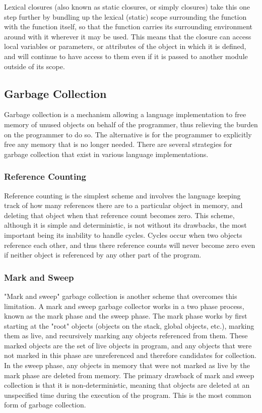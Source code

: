 \documentclass[12pt,a4paper,final,twoside,titlepage]{book}
\begin{document}
Lexical closures (also known as static closures, or simply closures) take this one step further by bundling up the lexical (static) scope surrounding the function with the function itself, so that the function carries its surrounding environment around with it wherever it may be used. This means that the closure can access local variables or parameters, or attributes of the object in which it is defined, and will continue to have access to them even if it is passed to another module outside of its scope.

\subsection{Garbage Collection}
Garbage collection is a mechanism allowing a language implementation to free memory of unused objects on behalf of the programmer, thus relieving the burden on the programmer to do so. The alternative is for the programmer to explicitly free any memory that is no longer needed. There are several strategies for garbage collection that exist in various language implementations.
\subsubsection{Reference Counting}
Reference counting is the simplest scheme and involves the language keeping track of how many references there are to a particular object in memory, and deleting that object when that reference count becomes zero. This scheme, although it is simple and deterministic, is not without its drawbacks, the most important being its inability to handle cycles. Cycles occur when two objects reference each other, and thus there reference counts will never become zero even if neither object is referenced by any other part of the program.
\subsubsection{Mark and Sweep}
"Mark and sweep" garbage collection is another scheme that overcomes this limitation. A mark and sweep garbage collector works in a two phase process, known as the mark phase and the sweep phase. The mark phase works by first starting at the "root" objects (objects on the stack, global objects, etc.), marking them as live, and recursively marking any objects referenced from them. These marked objects are the set of live objects in program, and any objects that were not marked in this phase are unreferenced and therefore candidates for collection. In the sweep phase, any objects in memory that were not marked as live by the mark phase are deleted from memory. The primary drawback of mark and sweep collection is that it is non-deterministic, meaning that objects are deleted at an unspecified time during the execution of the program. This is the most common form of garbage collection.
\end{document}
